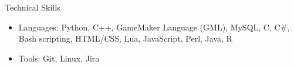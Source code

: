 \documentclass[calibri]{mcdowellcv}
\begin{document}
	\begin{cvsection}{Technical Skills}
		\begin{cvsubsection}{}{}{}	
			\begin{itemize}
				\item Languages: Python, C++, GameMaker Language (GML), MySQL, C, C\#, Bash scripting, HTML/CSS, Lua, JavaScript, Perl, Java, R 
				\item Tools: Git, Linux, Jira
			\end{itemize}
		\end{cvsubsection}
	\end{cvsection}
	
\end{document}
